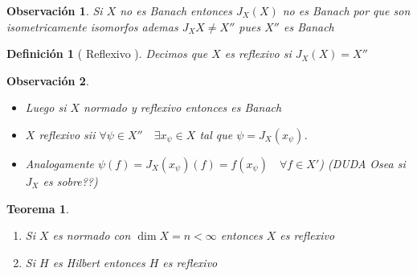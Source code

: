 \documentclass[10pt]{extarticle}
\theoremstyle{break}
\newtheorem{theorem}{Teorema}[section]
\newtheorem*{remark}{Observación}
\newtheorem{definition}{Definición}[section]
\theoremstyle{definition}
\begin{document}
\begin{remark}
Si $X$ no es Banach entonces $J_{X}(X)$ no es Banach por que son isometricamente isomorfos ademas $J_{X}X\neq X''$ pues $X''$ es Banach
\end{remark}

\begin{definition}[ Reflexivo ]
Decimos que $X$ es reflexivo si $J_{X}(X)=X''$ 
\end{definition}

\begin{remark}
	\begin{itemize}
		\item Luego si $X$ normado y reflexivo entonces es Banach
		\item $X$ reflexivo sii $\forall \psi\in X''\quad\exists x_{\psi}\in X$ tal que $\psi = J_{X}(x_{\psi})$. 
		\item Analogamente $\psi (f)=J_{X}(x_{\psi})(f)=f(x_{\psi})\quad\forall f\in X'$)
(DUDA Osea si $J_{X}$ es sobre??)

	\end{itemize}
\end{remark}

\begin{theorem}
\begin{enumerate}
\item
Si $X$ es normado con $\dim X=n<\infty$ entonces $X$ es reflexivo
\item
Si $H$ es Hilbert entonces $H$ es reflexivo
\end{enumerate}
\end{theorem}
\end{document}
